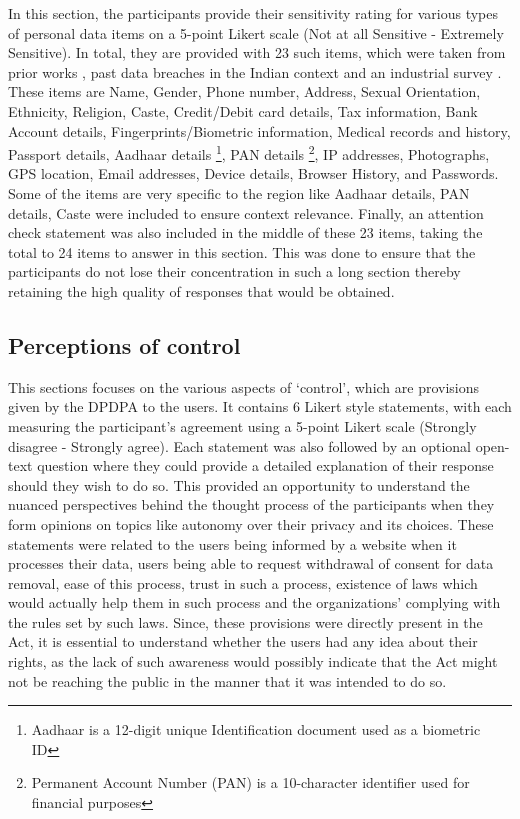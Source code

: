 In this section, the participants provide their sensitivity rating for various types of personal data items on a 5-point Likert scale (Not at all Sensitive - Extremely Sensitive). In total, they are provided with 23 such items, which were taken from prior works \cite{kumaraguru_privacy_2012, priyadarsini_web_2025}, past data breaches in the Indian context \cite{corbado2026data} and an industrial survey \cite{pwc_privacy_2024}. These items are Name, Gender, Phone number, Address, Sexual Orientation, Ethnicity, Religion, Caste, Credit/Debit card details, Tax information, Bank Account details, Fingerprints/Biometric information, Medical records and history, Passport details, Aadhaar details \footnote{Aadhaar is a 12-digit unique Identification document used as a biometric ID}, PAN details \footnote{Permanent Account Number (PAN) is a 10-character identifier used for financial purposes}, IP addresses, Photographs, GPS location, Email addresses, Device details, Browser History, and Passwords. Some of the items are very specific to the region like Aadhaar details, PAN details, Caste were included to ensure context relevance. Finally, an attention check statement was also included in the middle of these 23 items, taking the total to 24 items to answer in this section. This was done to ensure that the participants do not lose their concentration in such a long section thereby retaining the high quality of responses that would be obtained. 

\subsection{Perceptions of control} \label{Subsec: control}

This sections focuses on the various aspects of `control', which are provisions given by the DPDPA to the users. It contains 6 Likert style statements, with each measuring the participant's agreement using a 5-point Likert scale (Strongly disagree - Strongly agree). Each statement was also followed by an optional open-text question where they could provide a detailed explanation of their response should they wish to do so. This provided an opportunity to understand the nuanced perspectives behind the thought process of the participants when they form opinions on topics like autonomy over their privacy and its choices. These statements were related to the users being informed by a website when it processes their data, users being able to request withdrawal of consent for data removal, ease of this process, trust in such a process, existence of laws which would actually help them in such process and the organizations' complying with the rules set by such laws. Since, these provisions were directly present in the Act, it is essential to understand whether the users had any idea about their rights, as the lack of such awareness would possibly indicate that the Act might not be reaching the public in the manner that it was intended to do so.

